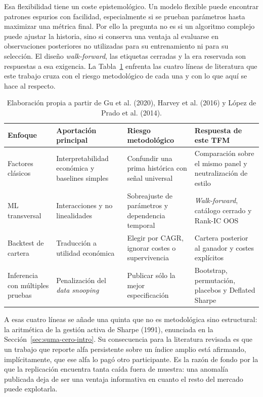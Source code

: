Esa flexibilidad tiene un coste epistemológico. Un modelo flexible puede encontrar patrones espurios
con facilidad, especialmente si se prueban parámetros hasta maximizar una métrica final. Por ello la
pregunta no es si un algoritmo complejo puede ajustar la historia, sino si conserva una ventaja al
evaluarse en observaciones posteriores no utilizadas para su entrenamiento ni para su selección.
El diseño \textit{walk-forward}, las etiquetas cerradas y la era reservada son respuestas a esa
exigencia. La Tabla~\ref{tab:posicionamiento} enfrenta las cuatro líneas de literatura que este
trabajo cruza con el riesgo metodológico de cada una y con lo que aquí se hace al respecto.

\begin{table}[htbp]
\centering
\small
\caption{Posicionamiento metodológico del estudio frente a líneas de literatura relevantes.}
\label{tab:posicionamiento}
\begin{tabularx}{\textwidth}{lXXX}
\toprule
Enfoque & Aportación principal & Riesgo metodológico & Respuesta de este TFM\\
\midrule
Factores clásicos & Interpretabilidad económica y baselines simples & Confundir una prima histórica con señal universal & Comparación sobre el mismo panel y neutralización de estilo\\
ML transversal & Interacciones y no linealidades & Sobreajuste de parámetros y dependencia temporal & \textit{Walk-forward}, catálogo cerrado y Rank-IC OOS\\
Backtest de cartera & Traducción a utilidad económica & Elegir por CAGR, ignorar costes o supervivencia & Cartera posterior al ganador y costes explícitos\\
Inferencia con múltiples pruebas & Penalización del \textit{data snooping} & Publicar sólo la mejor especificación & Bootstrap, permutación, placebos y Deflated Sharpe\\
\bottomrule
\end{tabularx}
\caption*{Elaboración propia a partir de Gu et al. (2020), Harvey et al. (2016) y
López de Prado et al. (2014).}
\end{table}

A esas cuatro líneas se añade una quinta que no es metodológica sino estructural: la aritmética de
la gestión activa de Sharpe (1991), enunciada en la Sección~\ref{sec:suma-cero-intro}. Su
consecuencia para la literatura revisada es que un trabajo que reporte alfa persistente sobre un
índice amplio está afirmando, implícitamente, que ese alfa lo pagó otro participante. Es la razón de
fondo por la que la replicación encuentra tanta caída fuera de muestra: una anomalía publicada deja
de ser una ventaja informativa en cuanto el resto del mercado puede explotarla.

